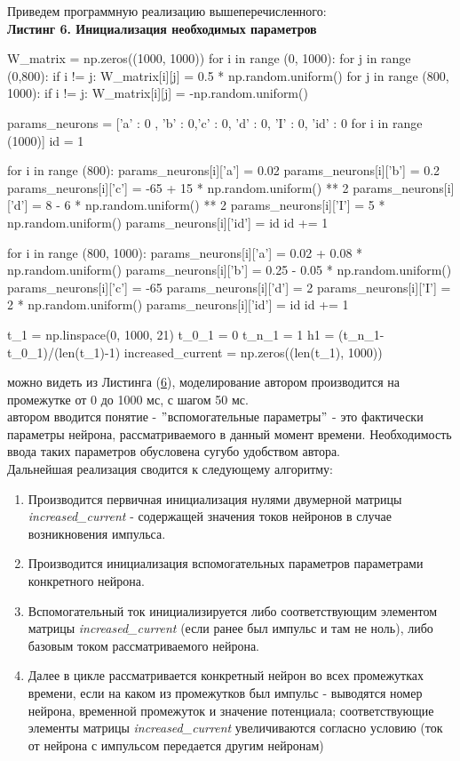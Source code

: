 Приведем программную реализацию вышеперечисленного:\\
\textbf{Листинг 6. Инициализация необходимых параметров}
\hypertarget{lst6}{}
\begin{python}
W_matrix = np.zeros((1000, 1000))
for i in range (0, 1000):
  for j in range (0,800):
    if i != j:
      W_matrix[i][j] = 0.5 * np.random.uniform()
  for j in range (800, 1000):
    if i != j:
      W_matrix[i][j] = -np.random.uniform()

params_neurons = [{'a' : 0 , 'b' : 0,'c' : 0, 'd' : 0, 'I' : 0, 'id' : 0} for i in range (1000)]
id = 1

for i in range (800):
  params_neurons[i]['a'] = 0.02
  params_neurons[i]['b'] = 0.2
  params_neurons[i]['c'] = -65 + 15 * np.random.uniform() ** 2
  params_neurons[i]['d'] = 8 - 6 *  np.random.uniform() ** 2
  params_neurons[i]['I'] = 5 * np.random.uniform() 
  params_neurons[i]['id'] = id
  id += 1

for i in range (800, 1000):
  params_neurons[i]['a'] = 0.02 + 0.08 * np.random.uniform()
  params_neurons[i]['b'] = 0.25 - 0.05 * np.random.uniform()
  params_neurons[i]['c'] = -65 
  params_neurons[i]['d'] = 2 
  params_neurons[i]['I'] = 2 * np.random.uniform() 
  params_neurons[i]['id'] = id
  id += 1

t_1 = np.linspace(0, 1000, 21)
t_0_1 = 0
t_n_1 = 1
h1 = (t_n_1-t_0_1)/(len(t_1)-1)
increased_current = np.zeros((len(t_1), 1000))
\end{python}
 можно видеть из Листинга (\hyperlink{lst6}{6}), моделирование автором производится на промежутке от 0 до 1000 мс, с шагом 50 мс. \\
 автором вводится понятие - $"$вспомогательные параметры$"$ - это фактически параметры нейрона, рассматриваемого в данный момент времени. Необходимость ввода таких параметров обусловена сугубо удобством автора. \\
Дальнейшая реализация сводится к следующему алгоритму:
\begin{enumerate}
    \item Производится первичная инициализация нулями двумерной матрицы \textit{increased_current} - содержащей значения токов нейронов в случае возникновения импульса.
	\item Производится инициализация вспомогательных параметров параметрами конкретного нейрона.
    \item Вспомогательный ток инициализируется либо соответствующим элементом матрицы \textit{increased_current} (если ранее был импульс и там не ноль), либо базовым током рассматриваемого нейрона.
    \item Далее в цикле рассматривается конкретный нейрон во всех промежутках времени, если на каком из промежутков был импульс - выводятся номер нейрона, временной промежуток и значение потенциала; соответствующие элементы матрицы \textit{increased_current} увеличиваются согласно условию (ток от нейрона с импульсом передается другим нейронам)
    
\end{enumerate}
